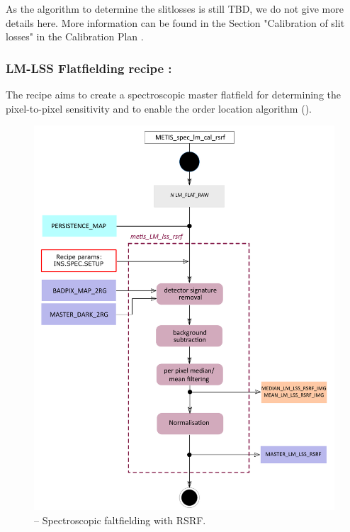 As the algorithm to determine the slitlosses is still TBD, we do not give more details here. More information can be found in the Section "Calibration of slit losses" in the Calibration Plan \cite{METIS-calibration_plan}. 


\subsubsection{LM-LSS Flatfielding recipe :}\label{rec:lsslmrsrf}
The recipe  aims to create a spectroscopic master flatfield for determining the pixel-to-pixel sensitivity and to enable the order location algorithm ().
\begin{figure}[ht]
  \centering
  \includegraphics[width=0.5\textheight]{figures/metis_lm_lss_rsrf_v0.72.pdf}
  \caption[Recipe: ]{ --
    Spectroscopic faltfielding with \ac{RSRF}.}
  \label{Fig:rec_lm_lss_rsrf}
\end{figure}

